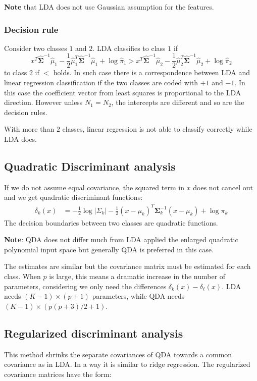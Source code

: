 \documentclass[12pt, letterpaper]{article}
\theoremstyle{definition}
\newcommand{\hsi}{\mathrm{\hat{\mathbf{\Sigma}}}^{-1}}
\newcommand{\si}{\mathbf{\Sigma}^{-1}}
\newcommand{\hmu}{\hat{\mu}}
\newcommand{\hpi}{\hat{\pi}}
\begin{document}
\textbf{Note} that LDA does not use Gaussian assumption for the features.

\subsubsection{Decision rule}
Consider two classes $1$ and $2$. LDA classifies to class $1$ if
\begin{equation}
x^T\hsi \hmu_1 - \frac{1}{2}\hmu_1^T\hsi\hmu_1 + \log \hpi_1 >x^T\hsi \hmu_2 - \frac{1}{2}\hmu_2^T\hsi\hmu_2 + \log \hpi_2
\end{equation}
to class $2$ if $<$ holds. In such case there is a correspondence between LDA and linear regression classification if the two classes are coded with $+1$ and $-1$. In this case the coefficient vector from least squares is proportional to the LDA direction. However unless $N_1=N_2$, the intercepts are different and so are the decision rules.

With more than $2$ classes, linear regression is not able to classify correctly while LDA does.

\subsection{Quadratic Discriminant analysis}
If we do not assume equal covariance, the squared term in $x$ does not cancel out and we get quadratic discriminant functions:
\begin{equation}
\label{QDA}
\begin{aligned}
\delta_k  (x) &= -\frac{1}{2} \log |\Sigma_k| -\frac{1}{2} \left( x - \mu_k \right)^T \si_k\left( x - \mu_k \right) + \log \pi_k
\end{aligned}
\end{equation}
The decision boundaries between two classes are quadratic functions.

\textbf{Note}: QDA does not differ much from LDA applied the enlarged quadratic polynomial input space but generally QDA is preferred in this case.

The estimates are similar but the covariance matrix must be estimated for each class. When $p$ is large, this means a dramatic increase in the number of parameters, considering we only need the differences $\delta_k (x) - \delta_\ell(x)$. LDA needs $(K-1)\times (p+1)$ parameters, while QDA needs $(K-1) \times \left(p\left(p+3\right)/2 +1\right)$.

\subsection{Regularized discriminant analysis}
This method shrinks the separate covariances of QDA towards a common covariance as in LDA. In a way it is similar to ridge regression. The regularized covariance matrices have the form:
\end{document}

